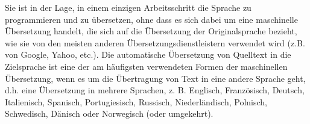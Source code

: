 Sie ist in der Lage, in einem einzigen Arbeitsschritt die Sprache zu programmieren und zu übersetzen, ohne dass es sich dabei um eine maschinelle Übersetzung handelt, die sich auf die Übersetzung der Originalsprache bezieht, wie sie von den meisten anderen Übersetzungsdienstleistern verwendet wird (z.B. von Google, Yahoo, etc.).
Die automatische Übersetzung von Quelltext in die Zielsprache ist eine der am häufigsten verwendeten Formen der maschinellen Übersetzung, wenn es um die Übertragung von Text in eine andere Sprache geht, d.h. eine Übersetzung in mehrere Sprachen, z. B. Englisch, Französisch, Deutsch, Italienisch, Spanisch, Portugiesisch, Russisch, Niederländisch, Polnisch, Schwedisch, Dänisch oder Norwegisch (oder umgekehrt).
